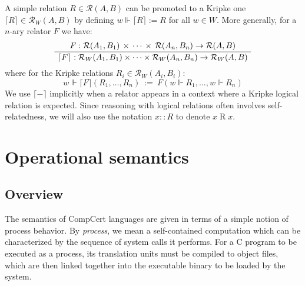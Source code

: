 \documentclass[acmsmall,authordraft]{acmart}
\begin{document}
A simple relation $R \in \mathcal{R}(A, B)$
can be promoted to a Kripke one
$\lceil R \rceil \in \mathcal{R}_W(A, B)$
by defining $w \Vdash \lceil R \rceil := R$ for all $w \in W$.
More generally, for a $n$-ary relator $F$ we have:
\[
  \AxiomC{$
    F :
      \mathcal{R}(A_1, B_1) \,\times\,\cdots\,\times\,\mathcal{R}(A_n, B_n)
      \rightarrow \mathcal{R}(A, B)$}
  \UnaryInfC{$
    \lceil F \rceil :
      \mathcal{R}_W(A_1, B_1) \times \cdots \times \mathcal{R}_W(A_n, B_n)
      \rightarrow \mathcal{R}_W(A, B)$}
  \DisplayProof
\]
where for the Kripke relations $R_i \in \mathcal{R}_W(A_i, B_i)$:
\[
  w \Vdash \lceil F \rceil (R_1, \ldots, R_n) \: := \:
    F(w \Vdash R_1, \ldots, w \Vdash R_n)
\]
We use $\lceil - \rceil$ implicitly
when a relator appears in a context where
a Kripke logical relation is expected.
Since reasoning with logical relations
often involves self-relatedness,
we will also use the notation
$x :: R$ to denote $x \mathrel{R} x$.



\section{Operational semantics} \label{sec:sem} %


\subsection{Overview} \label{sec:sem:overview} %

The semantics of CompCert languages
are given in terms of a simple notion of process behavior.
By \emph{process}, we mean a self-contained computation
which can be characterized by
the sequence of system calls it performs.
For a C program to be executed as a process,
its translation units must be compiled to object files,
which are then linked together
into the executable binary
to be loaded by the system.
\end{document}
